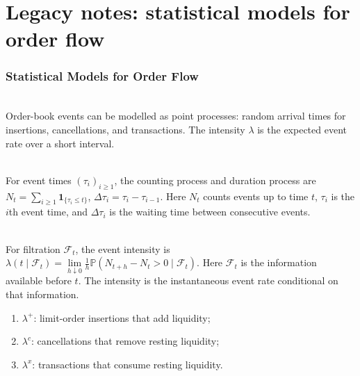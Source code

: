 \documentclass[a4paper,oneside,openany]{book}
\begin{document}
\chapter*{Legacy notes: statistical models for order flow}

\subsection*{Statistical Models for Order Flow}

\begin{definition} \\
Order-book events can be modelled as point processes: random arrival times for insertions, cancellations, and transactions. The intensity $\lambda$ is the expected event rate over a short interval.
\end{definition}

\begin{definition} \\
For event times $(\tau_i)_{i\geq1}$, the counting process and duration process are $N_t=\sum\limits_{i\geq1}\mathbf{1}_{\{\tau_i\leq t\}}$, $\Delta\tau_i=\tau_i-\tau_{i-1}$. Here $N_t$ counts events up to time $t$, $\tau_i$ is the $i$th event time, and $\Delta\tau_i$ is the waiting time between consecutive events.
\end{definition}

\begin{definition} \\
For filtration $\mathcal{F}_t$, the event intensity is $\lambda(t\mid\mathcal{F}_t)=\lim\limits_{h\downarrow0}\frac{1}{h}\mathbb{P}(N_{t+h}-N_t>0\mid\mathcal{F}_t)$. Here $\mathcal{F}_t$ is the information available before $t$. The intensity is the instantaneous event rate conditional on that information.
\end{definition}

\begin{taxonomy} 
\begin{enumerate}[label=\roman*.]
\setlength{\itemsep}{0pt}
\item $\lambda^+$: limit-order insertions that add liquidity;
\item $\lambda^c$: cancellations that remove resting liquidity;
\item $\lambda^x$: transactions that consume resting liquidity.
\end{enumerate}
\end{taxonomy}
\end{document}
